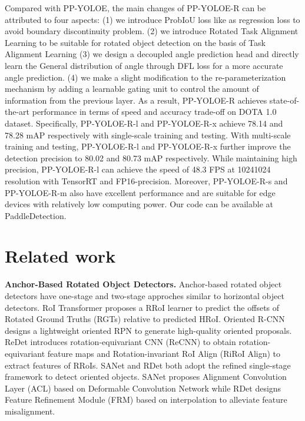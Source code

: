 \documentclass[final]{cvpr}
\begin{document}
Compared with PP-YOLOE, the main changes of PP-YOLOE-R can be attributed to four aspects: (1) we introduce ProbIoU loss\cite{llerena2021gaussian} like \cite{li2021fcosr} as regression loss to avoid boundary discontinuity problem. (2) we introduce Rotated Task Alignment Learning to be suitable for rotated object detection on the basis of Task Alignment Learning\cite{feng2021tood} (3) we design a decoupled angle prediction head and directly learn the General distribution of angle through DFL loss\cite{li2020generalized} for a more accurate angle prediction. (4) we make a slight modification to the re-parameterization mechanism\cite{ding2021repvgg} by adding a learnable gating unit to control the amount of information from the previous layer. As a result, PP-YOLOE-R achieves state-of-the-art performance in terms of speed and accuracy trade-off on DOTA 1.0 dataset. Specifically, PP-YOLOE-R-l and PP-YOLOE-R-x achieve 78.14 and 78.28 mAP respectively with single-scale training and testing. With multi-scale training and testing, PP-YOLOE-R-l and PP-YOLOE-R-x further improve the detection precision to 80.02 and 80.73 mAP respectively. While maintaining high precision, PP-YOLOE-R-l can achieve the speed of 48.3 FPS at 10241024 resolution with TensorRT and FP16-precision. Moreover, PP-YOLOE-R-s and PP-YOLOE-R-m also have excellent performance and are suitable for edge devices with relatively low computing power. Our code can be available at PaddleDetection\cite{ppdet2019}. 

\section{Related work}

{\bf Anchor-Based Rotated Object Detectors.} Anchor-based rotated object detectors have one-stage and two-stage approches similar to horizontal object detectors. RoI Transformer\cite{ding2019learning} proposes a RRoI learner to predict the offsets of Rotated Ground Truths (RGTs) relative to predicted HRoI. Oriented R-CNN\cite{xie2021oriented} designs a lightweight oriented RPN to generate high-quality oriented proposals. ReDet\cite{han2021redet} introduces rotation-equivariant CNN (ReCNN) to obtain rotation-equivariant feature maps and Rotation-invariant RoI Align (RiRoI Align) to extract features of RRoIs. SANet\cite{han2021align} and RDet\cite{yang2021r3det} both adopt the refined single-stage framework to detect oriented objects. SANet proposes Alignment Convolution Layer (ACL) based on Deformable Convolution Network while RDet designs Feature Refinement Module (FRM) based on interpolation to alleviate feature misalignment.
\end{document}
